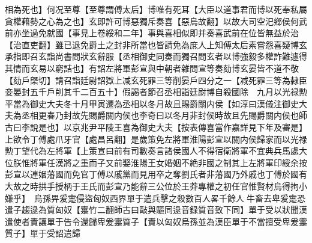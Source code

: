 相為死也】何况至尊【至尊謂傅太后】博唯有死耳【大臣以道事君而博以死奉私屬貪權藉勢之心為之也】玄即許可博惡獨斥奏喜【惡烏故翻】以故大司空汜鄉侯何武前亦坐過免就國【事見上卷綏和二年】事與喜相似即并奏喜武前在位皆無益於治【治直吏翻】雖已退免爵土之封非所當也皆請免為庶人上知傅太后素嘗怨喜疑博玄承指即召玄詣尚書問狀玄辭服【丞相御史同奏而獨召問玄者以博強毅多權詐難遽得其情而玄易以窮詰也】有詔左將軍彭宣與中朝者雜問宣等奏劾博玄晏皆不道不敬【劾戶槩切】請召詣廷尉詔獄上减玄死罪三等削晏戶四分之一【减死罪三等為隸臣妾晏封五千戶削其千二百五十】假謁者節召丞相詣廷尉博自殺國除　九月以光禄勲平當為御史大夫冬十月甲寅遷為丞相以冬月故且賜爵關内侯【如淳曰漢儀注御史大夫為丞相更春乃封故先賜爵關内侯也李奇曰以冬月非封侯時故且先賜爵關内侯也師古曰李說是也】以京兆尹平陵王喜為御史大夫【按表傳喜當作嘉詳見下年及審是】　上欲令丁傅處爪牙官【處昌呂翻】是歲策免左將軍淮陽彭宣以關内侯歸家而以光禄勲丁望代為左將軍【上策宣曰前有司數奏言諸侯國人不得宿衛將軍不宜典兵馬處大位朕惟將軍任漢將之重而子又前娶淮陽王女婚姻不絶非國之制其上左將軍印綬余按彭宣以連姻藩國而免官丁傅以戚黨而見用卒之奪劉氏者非藩國乃外戚也丁傅於國有大故之時拱手授柄于王氏而彭宣乃能辭三公位於王莽專權之初任官惟賢材烏得拘小嫌乎】　烏孫畀爰疐侵盜匈奴西界單于遣兵擊之殺數百人畧千餘人牛畜去卑爰疐恐遣子趨逯為質匈奴【疐竹二翻師古曰敺與驅同逯音録質音致下同】單于受以狀聞漢遣使者責讓單于告令還歸卑爰疐質子【責以匈奴烏孫並為漢臣單于不當擅受卑爰疐質子】單于受詔遣歸

